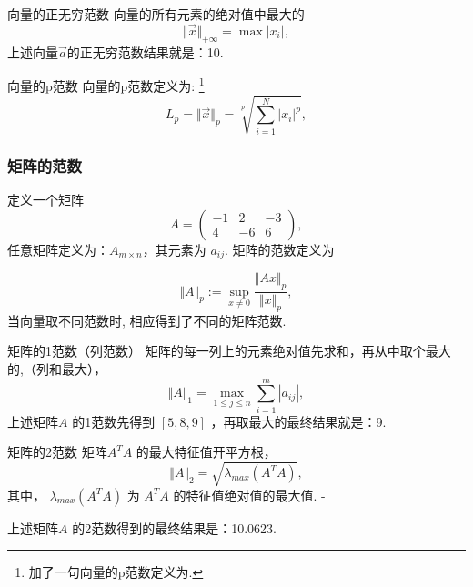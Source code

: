 \begin{defination}{向量的正无穷范数}
  向量的所有元素的绝对值中最大的
  \begin{equation}
    \label{eq:1.4.1.4}
\Vert\vec{x}\Vert_{+\infty}=\max{|{x_i}|},    
\end{equation}
上述向量\(\vec{a}\)的正无穷范数结果就是：10.
\end{defination}

\begin{defination}{向量的p范数}
  向量的p范数定义为:
  \footnote{加了一句向量的p范数定义为.}
\begin{equation}
  \label{eq:1.4.1.5} 
L_p=\Vert\vec{x}\Vert_p=\sqrt[p]{\sum_{i=1}^{N}|{x_i}|^p}, 
\end{equation}  
\end{defination}

\subsubsection{矩阵的范数}
\label{sec:1.4.2}
定义一个矩阵
\begin{equation*}
  A=
  \begin{pmatrix}
    -1 & 2 & -3 \\
    4 & -6 & 6
  \end{pmatrix}
  ,
\end{equation*}
任意矩阵定义为：\(A_{m\times n}\)，其元素为 \(a_{ij}\).
矩阵的范数定义为

\begin{equation}
  \label{eq:1.4.2.1}
\Vert{A}\Vert_p :=\sup_{x\neq 0}\frac{\Vert{Ax}\Vert_p}{\Vert{x}\Vert_p},  
\end{equation}
当向量取不同范数时, 相应得到了不同的矩阵范数.

\begin{defination}{矩阵的1范数（列范数）}
  矩阵的每一列上的元素绝对值先求和，再从中取个最大的,（列和最大），
  \begin{equation}
    \label{eq:1.4.2.2}
\Vert A\Vert_1=\max_{1\le j\le n}\sum_{i=1}^m|{a_{ij}}|,    
  \end{equation}
  上述矩阵\(A\) 的1范数先得到 \([5,8,9]\) ，再取最大的最终结果就是：9.
\end{defination}


\begin{defination}{矩阵的2范数}
  矩阵\(A^TA\) 的最大特征值开平方根，
  \begin{equation}
    \label{eq:1.4.2.3}
\Vert A\Vert_2=\sqrt{\lambda_{max}(A^T A)},    
\end{equation}
其中， \(\lambda_{max}(A^T A)\) 为 \(A^T A​\) 的特征值绝对值的最大值. -

上述矩阵\(A\) 的2范数得到的最终结果是：10.0623.
\end{defination}

